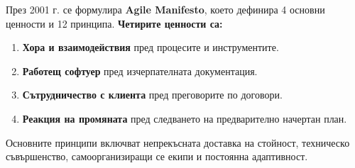 \documentclass{scrartcl}
\begin{document}
\begin{FlushLeft}
През 2001 г. се формулира \textbf{Agile Manifesto}, което дефинира 4 основни ценности и 12 принципа.
\textbf{Четирите ценности са:}
\begin{enumerate}
    \item \textbf{Хора и взаимодействия} пред процесите и инструментите.
    \item \textbf{Работещ софтуер} пред изчерпателната документация.
    \item \textbf{Сътрудничество с клиента} пред преговорите по договори.
    \item \textbf{Реакция на промяната} пред следването на предварително начертан план.
\end{enumerate}
Основните принципи включват непрекъсната доставка на стойност, техническо съвършенство, самоорганизиращи се екипи и постоянна адаптивност.


\end{FlushLeft}
\end{document}
